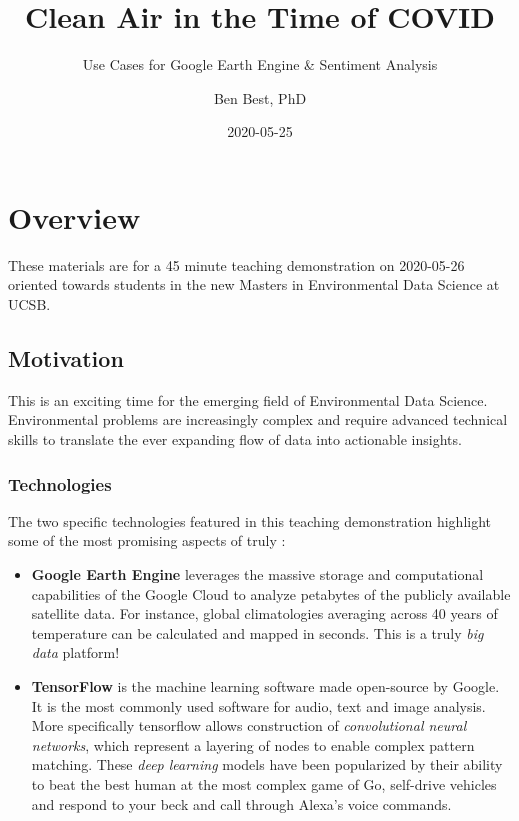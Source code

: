 \documentclass[]{book}
\title{Clean Air in the Time of COVID}
\subtitle{Use Cases for Google Earth Engine \& Sentiment Analysis}
\author{Ben Best, PhD}
\date{2020-05-25}
\begin{document}
\maketitle

{
\setcounter{tocdepth}{1}
\tableofcontents
}
\hypertarget{overview}{%
\chapter*{Overview}\label{overview}}

These materials are for a 45 minute teaching demonstration on 2020-05-26 oriented towards students in the new Masters in Environmental Data Science at UCSB.

\hypertarget{motivation}{%
\section*{Motivation}\label{motivation}}

This is an exciting time for the emerging field of Environmental Data Science. Environmental problems are increasingly complex and require advanced technical skills to translate the ever expanding flow of data into actionable insights.

\hypertarget{technologies}{%
\subsection*{Technologies}\label{technologies}}

The two specific technologies featured in this teaching demonstration highlight some of the most promising aspects of truly :

\begin{itemize}
\item
  \textbf{Google Earth Engine} leverages the massive storage and computational capabilities of the Google Cloud to analyze petabytes of the publicly available satellite data. For instance, global climatologies averaging across 40 years of temperature can be calculated and mapped in seconds. This is a truly \emph{big data} platform!
\item
  \textbf{TensorFlow} is the machine learning software made open-source by Google. It is the most commonly used software for audio, text and image analysis. More specifically tensorflow allows construction of \emph{convolutional neural networks}, which represent a layering of nodes to enable complex pattern matching. These \emph{deep learning} models have been popularized by their ability to beat the best human at the most complex game of Go, self-drive vehicles and respond to your beck and call through Alexa's voice commands.
\end{itemize}
\end{document}
